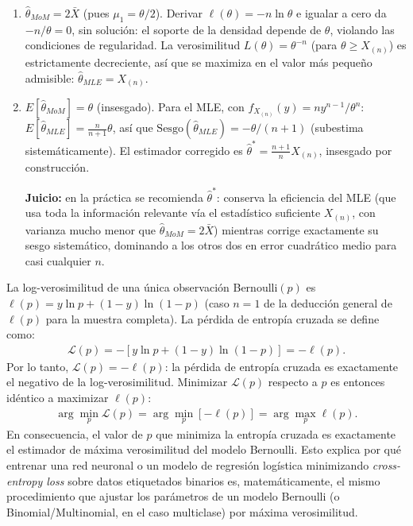 \begin{solproblema}[prob:23bb182]
	\begin{enumerate}
		\item $\hat{\theta}_{MoM}=2\bar{X}$ (pues $\mu_1=\theta/2$). Derivar $\ell(\theta)=-n\ln\theta$ e igualar a cero da $-n/\theta=0$, sin solución: el soporte de la densidad depende de $\theta$, violando las condiciones de regularidad. La verosimilitud $L(\theta)=\theta^{-n}$ (para $\theta\ge X_{(n)}$) es estrictamente decreciente, así que se maximiza en el valor más pequeño admisible: $\hat{\theta}_{MLE}=X_{(n)}$.
		\item $E[\hat{\theta}_{MoM}]=\theta$ (insesgado). Para el MLE, con $f_{X_{(n)}}(y)=ny^{n-1}/\theta^n$: $E[\hat{\theta}_{MLE}] = \frac{n}{n+1}\theta$, así que $\text{Sesgo}(\hat{\theta}_{MLE})=-\theta/(n+1)$ (subestima sistemáticamente). El estimador corregido es $\hat{\theta}^* = \frac{n+1}{n}X_{(n)}$, insesgado por construcción.

		\textbf{Juicio:} en la práctica se recomienda $\hat{\theta}^*$: conserva la eficiencia del MLE (que usa toda la información relevante vía el estadístico suficiente $X_{(n)}$, con varianza mucho menor que $\hat{\theta}_{MoM}=2\bar{X}$) mientras corrige exactamente su sesgo sistemático, dominando a los otros dos en error cuadrático medio para casi cualquier $n$.
	\end{enumerate}
\end{solproblema}

\begin{solproblema}[prob:0675127]
	La log-verosimilitud de una única observación Bernoulli$(p)$ es $\ell(p) = y\ln p + (1-y)\ln(1-p)$ (caso $n=1$ de la deducción general de $\ell(p)$ para la muestra completa). La pérdida de entropía cruzada se define como:
	\begin{align}
		\mathcal{L}(p) = -[y\ln p + (1-y)\ln(1-p)] = -\ell(p).
	\end{align}
	Por lo tanto, $\mathcal{L}(p) = -\ell(p)$: la pérdida de entropía cruzada es exactamente el negativo de la log-verosimilitud. Minimizar $\mathcal{L}(p)$ respecto a $p$ es entonces idéntico a maximizar $\ell(p)$:
	\begin{align}
		\arg\min_p \mathcal{L}(p) = \arg\min_p [-\ell(p)] = \arg\max_p \ell(p).
	\end{align}
	En consecuencia, el valor de $p$ que minimiza la entropía cruzada es exactamente el estimador de máxima verosimilitud del modelo Bernoulli. Esto explica por qué entrenar una red neuronal o un modelo de regresión logística minimizando \emph{cross-entropy loss} sobre datos etiquetados binarios es, matemáticamente, el mismo procedimiento que ajustar los parámetros de un modelo Bernoulli (o Binomial/Multinomial, en el caso multiclase) por máxima verosimilitud.
\end{solproblema}
